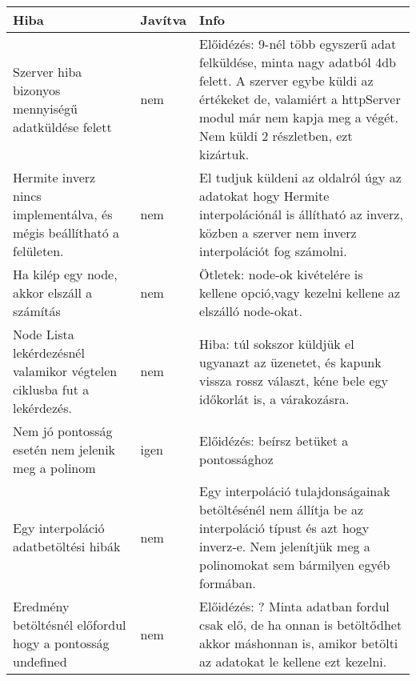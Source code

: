 	\begin{center}
  	\begin{tabular}{| p{4cm} | p{1.5cm} | p{8cm} |}
    \hline
    Hiba & Javítva & Info
    \\ \hline
    	Szerver hiba bizonyos mennyiségű adatküldése felett 
      &
    	nem
      &  
    	Előidézés: 9-nél több egyszerű adat felküldése, minta nagy adatból 4db felett.
    	A szerver egybe küldi az értékeket de, valamiért a httpServer modul már nem kapja meg a végét. Nem küldi 2 részletben, ezt kizártuk.
    \\ \hline
    	Hermite inverz nincs implementálva, és mégis beállítható a felületen.  
      &
      	nem
      &
		El tudjuk küldeni az oldalról úgy az adatokat hogy Hermite interpolációnál is állítható az inverz, közben a szerver nem inverz interpolációt fog számolni.
    \\ \hline
        Ha kilép egy node, akkor elszáll a számítás 
      &
      	nem
      &
		Ötletek: node-ok kivételére is kellene opció,vagy kezelni kellene az elszálló node-okat.
    \\ \hline
        Node Lista lekérdezésnél valamikor végtelen ciklusba fut a lekérdezés. 
      &
      	nem
      &
		Hiba: túl sokszor küldjük el ugyanazt az üzenetet, és kapunk vissza rossz választ, kéne bele egy időkorlát is, a várakozásra. 
	\\ \hline
        Nem jó pontosság esetén nem jelenik meg a polinom
      &
      	igen
      &
		Előidézés: beírsz betüket a pontossághoz 
    \\ \hline
        Egy interpoláció adatbetöltési hibák
      &
      	nem
      &
      	Egy interpoláció tulajdonságainak betöltésénél nem állítja be az interpoláció típust és azt hogy inverz-e.
      	Nem jelenítjük meg a polinomokat sem bármilyen egyéb formában.
    \\ \hline
        Eredmény betöltésnél előfordul hogy a pontosság undefined 
      &
      	nem
      &
		Előidézés: ? Minta adatban fordul csak elő, de ha onnan  is betöltődhet akkor máshonnan is, amikor betölti az adatokat le kellene ezt kezelni.
    \\ \hline
  	\end{tabular}
	\end{center}